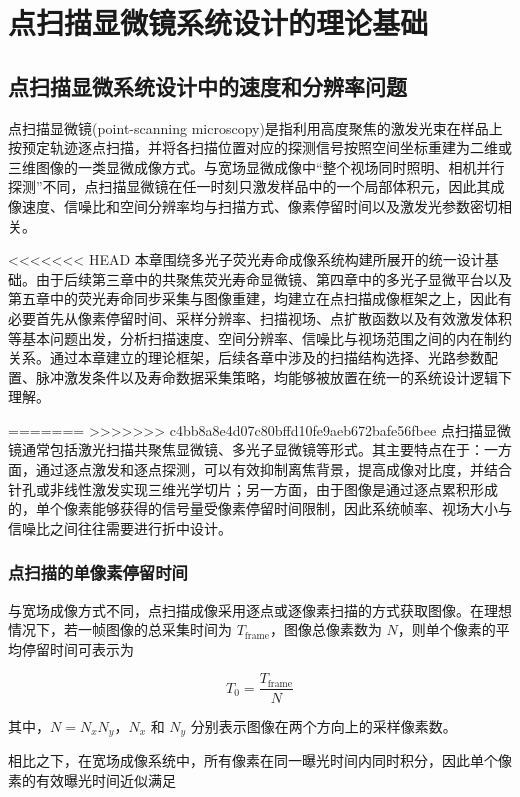 \chapter{点扫描显微镜系统设计的理论基础}\label{chap:2}
\section{点扫描显微系统设计中的速度和分辨率问题}\label{2.1}
点扫描显微镜(point-scanning microscopy)是指利用高度聚焦的激发光束在样品上按预定轨迹逐点扫描，并将各扫描位置对应的探测信号按照空间坐标重建为二维或三维图像的一类显微成像方式。与宽场显微成像中``整个视场同时照明、相机并行探测''不同，点扫描显微镜在任一时刻只激发样品中的一个局部体积元，因此其成像速度、信噪比和空间分辨率均与扫描方式、像素停留时间以及激发光参数密切相关。

<<<<<<< HEAD
本章围绕多光子荧光寿命成像系统构建所展开的统一设计基础。由于后续第三章中的共聚焦荧光寿命显微镜、第四章中的多光子显微平台以及第五章中的荧光寿命同步采集与图像重建，均建立在点扫描成像框架之上，因此有必要首先从像素停留时间、采样分辨率、扫描视场、点扩散函数以及有效激发体积等基本问题出发，分析扫描速度、空间分辨率、信噪比与视场范围之间的内在制约关系。通过本章建立的理论框架，后续各章中涉及的扫描结构选择、光路参数配置、脉冲激发条件以及寿命数据采集策略，均能够被放置在统一的系统设计逻辑下理解。

=======
>>>>>>> c4bb8a8e4d07c80bffd10fe9aeb672bafe56fbee
点扫描显微镜通常包括激光扫描共聚焦显微镜、多光子显微镜等形式。其主要特点在于：一方面，通过逐点激发和逐点探测，可以有效抑制离焦背景，提高成像对比度，并结合针孔或非线性激发实现三维光学切片；另一方面，由于图像是通过逐点累积形成的，单个像素能够获得的信号量受像素停留时间限制，因此系统帧率、视场大小与信噪比之间往往需要进行折中设计。

\subsection{点扫描的单像素停留时间}\label{2.1.1}
与宽场成像方式不同，点扫描成像采用逐点或逐像素扫描的方式获取图像。在理想情况下，若一帧图像的总采集时间为 $T_{\mathrm{frame}}$，图像总像素数为 $N$，则单个像素的平均停留时间可表示为

\begin{equation}
T_0=\frac{T_{\mathrm{frame}}}{N}
\label{eq:dwell_time_basic}
\end{equation}

其中，$N=N_xN_y$，$N_x$ 和 $N_y$ 分别表示图像在两个方向上的采样像素数。

相比之下，在宽场成像系统中，所有像素在同一曝光时间内同时积分，因此单个像素的有效曝光时间近似满足

